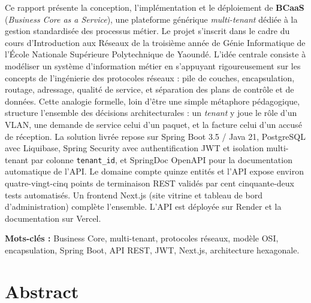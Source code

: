 \documentclass[11pt,a4paper,oneside]{report}
\begin{document}
Ce rapport présente la conception, l'implémentation et le déploiement de \textbf{BCaaS}
(\emph{Business Core as a Service}), une plateforme générique \emph{multi-tenant}
dédiée à la gestion standardisée des processus métier. Le projet s'inscrit dans le cadre
du cours d'Introduction aux Réseaux de la troisième année de Génie Informatique de
l'École Nationale Supérieure Polytechnique de Yaoundé. L'idée centrale consiste à modéliser un système d'information métier en s'appuyant rigoureusement sur les concepts de l'ingénierie des protocoles réseaux : pile de couches,
encapsulation, routage, adressage, qualité de service, et séparation des plans de contrôle
et de données. Cette analogie formelle, loin d'être une simple métaphore pédagogique,
structure l'ensemble des décisions architecturales : un \emph{tenant} y joue le rôle d'un
VLAN, une demande de service celui d'un paquet, et la facture celui d'un accusé de
réception. La solution livrée repose sur Spring Boot 3.5 / Java 21, PostgreSQL avec Liquibase,
Spring Security avec authentification JWT et isolation multi-tenant par colonne
\texttt{tenant\_id}, et SpringDoc OpenAPI pour la documentation automatique de l'API.
Le domaine compte quinze entités et l'API expose environ quatre-vingt-cinq points de
terminaison REST validés par cent cinquante-deux tests automatisés. Un frontend Next.js
(site vitrine et tableau de bord d'administration) complète l'ensemble. L'API est déployée
sur Render et la documentation sur Vercel.

\vspace{6pt}
\noindent\textbf{Mots-clés :} Business Core, multi-tenant, protocoles réseaux, modèle OSI,
encapsulation, Spring Boot, API REST, JWT, Next.js, architecture hexagonale.

\chapter*{Abstract}
\end{document}
